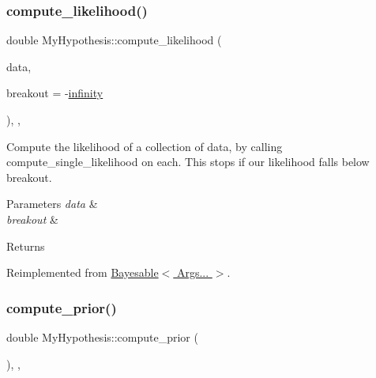 \subsubsection{\texorpdfstring{compute\+\_\+likelihood()}{compute\_likelihood()}\hspace{0.1cm}{\footnotesize\ttfamily [2/2]}}
{\footnotesize\ttfamily double My\+Hypothesis\+::compute\+\_\+likelihood (\begin{DoxyParamCaption}\item[{const \hyperlink{class_bayesable_aa2788c4d7718c0a824e1d28c4c98f921}{data\+\_\+t} \&}]{data,  }\item[{const double}]{breakout = {\ttfamily -\/\hyperlink{_numerics_8h_a1bb1e42ae1b40cad6e99da0aab8a5576}{infinity}} }\end{DoxyParamCaption})\hspace{0.3cm}{\ttfamily [inline]}, {\ttfamily [override]}, {\ttfamily [virtual]}}



Compute the likelihood of a collection of data, by calling compute\+\_\+single\+\_\+likelihood on each. This stops if our likelihood falls below breakout. 


\begin{DoxyParams}{Parameters}
{\em data} & \\
\hline
{\em breakout} & \\
\hline
\end{DoxyParams}
\begin{DoxyReturn}{Returns}

\end{DoxyReturn}


Reimplemented from \hyperlink{class_bayesable_a202493156cec15937bee304d807fdbdb}{Bayesable$<$ Args... $>$}.

\mbox{\label{class_my_hypothesis_a67477313b60b21158bbfaad35dc5d275}} 
\subsubsection{\texorpdfstring{compute\+\_\+prior()}{compute\_prior()}\hspace{0.1cm}{\footnotesize\ttfamily [1/2]}}
{\footnotesize\ttfamily double My\+Hypothesis\+::compute\+\_\+prior (\begin{DoxyParamCaption}{ }\end{DoxyParamCaption})\hspace{0.3cm}{\ttfamily [inline]}, {\ttfamily [override]}, {\ttfamily [virtual]}}



